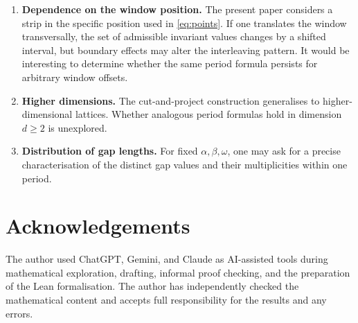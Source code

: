 \documentclass[11pt]{article}
\theoremstyle{plain}
\theoremstyle{definition}
\theoremstyle{remark}
\begin{document}
\begin{enumerate}
    \item \textbf{Dependence on the window position.}
    The present paper considers a strip in the specific position used in
    \eqref{eq:points}.  If one translates the window transversally, the set of
    admissible invariant values changes by a shifted interval, but boundary
    effects may alter the interleaving pattern.  It would be interesting to
    determine whether the same period formula persists for arbitrary window
    offsets.

    \item \textbf{Higher dimensions.}
    The cut-and-project construction generalises to higher-dimensional
    lattices.  Whether analogous period formulas hold in dimension $d \ge 2$
    is unexplored.

    \item \textbf{Distribution of gap lengths.}
    For fixed $\alpha, \beta, \omega$, one may ask for a precise
    characterisation of the distinct gap values and their multiplicities
    within one period.
\end{enumerate}

\section*{Acknowledgements}

The author used ChatGPT, Gemini, and Claude as AI-assisted tools during mathematical exploration, drafting, informal proof checking, and the preparation of the Lean formalisation. The author has independently checked the mathematical content and accepts full responsibility for the results and any errors.
\end{document}
